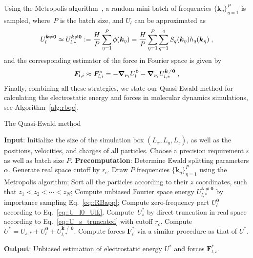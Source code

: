 Using the Metropolis algorithm~\cite{metropolis1953equation}, a random mini-batch of frequencies $\{\bm{k}_{\eta}\}_{\eta=1}^P$ is sampled, where~$P$ is the batch size, and $U_l$ can be approximated as 
\begin{equation}\label{eq::RBapp}
 U_l^{\bm{k}\neq \bm{0}} \approx U_{l,\ast}^{\bm{k}\neq \bm{0}}  :=   \frac{H}{P}\sum_{\eta=1}^P \phi(\bm{k}_{\eta})=  \frac{H}{P}\sum_{\eta=1}^P \sum_{q=1}^4S_q(\bm{k}_{\eta})h_q(\bm{k}_{\eta})\;,
\end{equation} 
and the corresponding estimator of the force in Fourier space is given by
\begin{equation}
	 \bm{F}_{l,i}\approx\bm{F}_{l,i}^*=-  \boldsymbol{\nabla}_{\boldsymbol{r}_i} U_l^{\bm{0}}- \boldsymbol{\nabla}_{\boldsymbol{r}_i} U_{l,\ast}^{\bm{k}\neq \bm{0}}\;,
 \end{equation}
Finally, combining all these strategies, we state our Quasi-Ewald method for calculating the electrostatic energy and forces in molecular dynamics simulations, see Algorithm~\ref{alg:rbqe}.
\begin{algorithm}[ht] 
\caption{The Quasi-Ewald method}
\begin{algorithmic}[1]
    \State \textbf{Input}:  Initialize the size of the simulation box $(L_x,L_y, L_z)$, as well as the positions, velocities, and charges of all particles. Choose a precision requirement $\varepsilon$ as well as batch size $P$.
    \State \textbf{Precomputation}:  Determine Ewald splitting parameters $\alpha$. Generate real space cutoff by $r_c$.
    \Procedure{}       
        \State Draw $P$ frequencies $\{\bm{k}_{\eta}\}_{\eta=1}^{P}$ using the Metropolis algorithm;
        \State Sort all the particles according to their $z$ coordinates, such that $z_1 < z_2 < \cdots < z_N$;
        \State Compute unbiased Fourier space energy $U_{l, *}^{\bm{k}\neq\bm{0}}$ by importance sampling Eq.~\eqref{eq::RBapp};
        \State Compute zero-frequency part $U_{l}^{\bm{0}}$ according to Eq.~\eqref{eq::U_l0_Ulk}.
        \State Compute~$U_{s}^{*}$ by direct truncation in real space according to Eq.~\eqref{eq::U_s_truncated} with cutoff $r_c$. %
        \State Compute $U^{*} = U_{s, *} + U_{l}^{\bm{0}} + U_{l, *}^{\bm{k}\neq\bm{0}}$.
        \State Compute forces $\bm{F}_{i}^{*}$ via a similar procedure as that of $U^{*}$.
    \EndProcedure

    \State \textbf{Output}: Unbiased estimation of electrostatic energy $U^{*}$ and forces $\bm{F}_{l,i}^{*}$.
\end{algorithmic}\label{alg:rbqe}
\end{algorithm}
